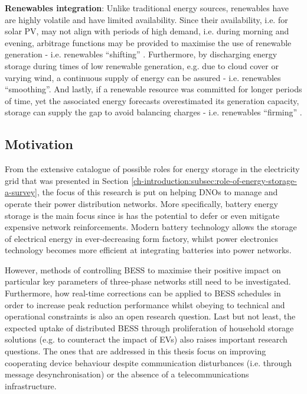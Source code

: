 \textbf{Renewables integration}: Unlike traditional energy sources, renewables have are highly volatile and have limited availability.
Since their availability, i.e. for solar PV, may not align with periods of high demand, i.e. during morning and evening, arbitrage functions may be provided to maximise the use of renewable generation - i.e. renewables ``shifting'' \cite{Zakeri2015}.
Furthermore, by discharging energy storage during times of low renewable generation, e.g. due to cloud cover or varying wind, a continuous supply of energy can be assured - i.e. renewables ``smoothing''.
And lastly, if a renewable resource was committed for longer periods of time, yet the associated energy forecasts overestimated its generation capacity, storage can supply the gap to avoid balancing charges - i.e. renewables ``firming'' \cite{Chakraborty2012}.

\subsection{Motivation}
\label{ch-introduction:subsec:motivation}

From the extensive catalogue of possible roles for energy storage in the electricity grid that was presented in Section \ref{ch-introduction:subsec:role-of-energy-storage-a-survey}, the focus of this research is put on helping DNOs to manage and operate their power distribution networks.
More specifically, battery energy storage is the main focus since is has the potential to defer or even mitigate expensive network reinforcements.
Modern battery technology allows the storage of electrical energy in ever-decreasing form factory, whilst power electronics technology becomes more efficient at integrating batteries into power networks.

However, methods of controlling BESS to maximise their positive impact on particular key parameters of three-phase networks still need to be investigated.
Furthermore, how real-time corrections can be applied to BESS schedules in order to increase peak reduction performance whilst obeying to technical and operational constraints is also an open research question.
Last but not least, the expected uptake of distributed BESS through proliferation of household storage solutions (e.g. to counteract the impact of EVs) also raises important research questions.
The ones that are addressed in this thesis focus on improving cooperating device behaviour despite communication disturbances (i.e. through message desynchronisation) or the absence of a telecommunications infrastructure.





